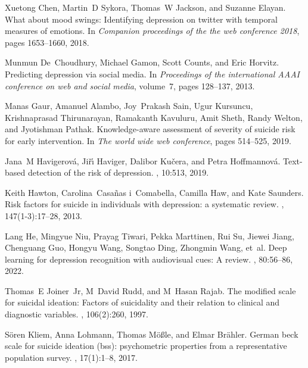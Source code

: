 \begin{thebibliography}{10}
Xuetong Chen, Martin~D Sykora, Thomas~W Jackson, and Suzanne Elayan.
\newblock What about mood swings: Identifying depression on twitter with
  temporal measures of emotions.
\newblock In {\em Companion proceedings of the the web conference 2018}, pages
  1653--1660, 2018.

Munmun De~Choudhury, Michael Gamon, Scott Counts, and Eric Horvitz.
\newblock Predicting depression via social media.
\newblock In {\em Proceedings of the international AAAI conference on web and
  social media}, volume~7, pages 128--137, 2013.

Manas Gaur, Amanuel Alambo, Joy~Prakash Sain, Ugur Kursuncu, Krishnaprasad
  Thirunarayan, Ramakanth Kavuluru, Amit Sheth, Randy Welton, and Jyotishman
  Pathak.
\newblock Knowledge-aware assessment of severity of suicide risk for early
  intervention.
\newblock In {\em The world wide web conference}, pages 514--525, 2019.

Jana~M Havigerov{\'a}, Ji{\v{r}}{\'\i} Haviger, Dalibor Ku{\v{c}}era, and Petra
  Hoffmannov{\'a}.
\newblock Text-based detection of the risk of depression.
, 10:513, 2019.

Keith Hawton, Carolina~Casa{\~n}as i~Comabella, Camilla Haw, and Kate Saunders.
\newblock Risk factors for suicide in individuals with depression: a systematic
  review.
, 147(1-3):17--28, 2013.

Lang He, Mingyue Niu, Prayag Tiwari, Pekka Marttinen, Rui Su, Jiewei Jiang,
  Chenguang Guo, Hongyu Wang, Songtao Ding, Zhongmin Wang, et~al.
\newblock Deep learning for depression recognition with audiovisual cues: A
  review.
, 80:56--86, 2022.

Thomas~E Joiner~Jr, M~David Rudd, and M~Hasan Rajab.
\newblock The modified scale for suicidal ideation: Factors of suicidality and
  their relation to clinical and diagnostic variables.
, 106(2):260, 1997.

S{\"o}ren Kliem, Anna Lohmann, Thomas M{\"o}{\ss}le, and Elmar Br{\"a}hler.
\newblock German beck scale for suicide ideation (bss): psychometric properties
  from a representative population survey.
, 17(1):1--8, 2017.


\end{thebibliography}
